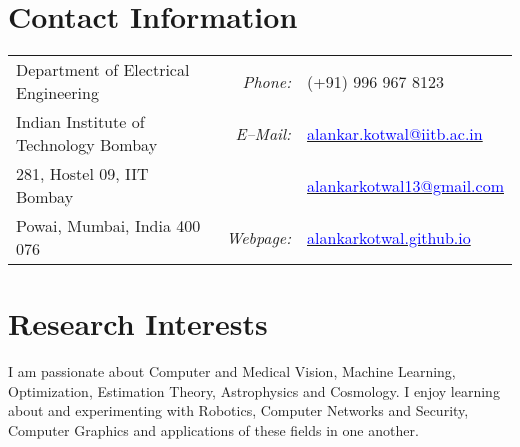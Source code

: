 \documentclass[margin,line]{res}
\begin{document}

\begin{resume}
\section{\sc Contact Information}
\vspace{.05in}
\begin{tabular}{@{}p{2.9in}p{.5in}p{3in}}
Department of Electrical Engineering & \multicolumn{1}{r}{\it Phone:}  &(+91) 996 967 8123 \\            
Indian Institute of Technology Bombay &\multicolumn{1}{r}{\it E--Mail:}& \href{mailto:alankar.kotwal@iitb.ac.in}{\textcolor{blue}{alankar.kotwal@iitb.ac.in}} \\ 
281, Hostel 09, IIT Bombay & & \href{mailto:alankarkotwal13@gmail.com}{\textcolor{blue}{alankarkotwal13@gmail.com}} \\ 
Powai, Mumbai, India 400 076 & \multicolumn{1}{r}{\it Webpage:} &\href{http://alankarkotwal.github.io/}{\textcolor{blue}{alankarkotwal.github.io}} \\     
\end{tabular}

\section{\sc Research Interests}
I am passionate about Computer and Medical Vision, Machine Learning, Optimization, Estimation Theory, Astrophysics and Cosmology. I enjoy learning about and experimenting with Robotics, Computer Networks and Security, Computer Graphics and applications of these fields in one another.


\end{resume}
\end{document}
